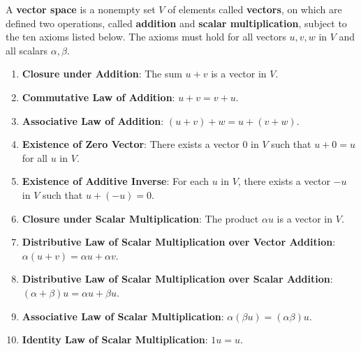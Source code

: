 \documentclass[10pt, a4paper]{article}
\begin{document}
\begin{definition}
    A \textbf{vector space} is a nonempty set $V$ of elements called \textbf{vectors}, on which are defined two operations, called \textbf{addition} and \textbf{scalar multiplication}, subject to the ten axioms listed below. The axioms must hold for all vectors $u, v, w$ in $V$ and all scalars $\alpha, \beta$.
    \begin{enumerate}
        \item \textbf{Closure under Addition}: The sum $u + v$ is a vector in $V$.
        \item \textbf{Commutative Law of Addition}: $u + v = v + u$.
        \item \textbf{Associative Law of Addition}: $(u + v) + w = u + (v + w)$.
        \item \textbf{Existence of Zero Vector}: There exists a vector $0$ in $V$ such that $u + 0 = u$ for all $u$ in $V$.
        \item \textbf{Existence of Additive Inverse}: For each $u$ in $V$, there exists a vector $-u$ in $V$ such that $u + (-u) = 0$.
        \item \textbf{Closure under Scalar Multiplication}: The product $\alpha u$ is a vector in $V$.
        \item \textbf{Distributive Law of Scalar Multiplication over Vector Addition}: $\alpha(u + v) = \alpha u + \alpha v$.
        \item \textbf{Distributive Law of Scalar Multiplication over Scalar Addition}: $(\alpha + \beta)u = \alpha u + \beta u$.
        \item \textbf{Associative Law of Scalar Multiplication}: $\alpha(\beta u) = (\alpha\beta)u$.
        \item \textbf{Identity Law of Scalar Multiplication}: $1u = u$.
    \end{enumerate}
\end{definition}
\end{document}
